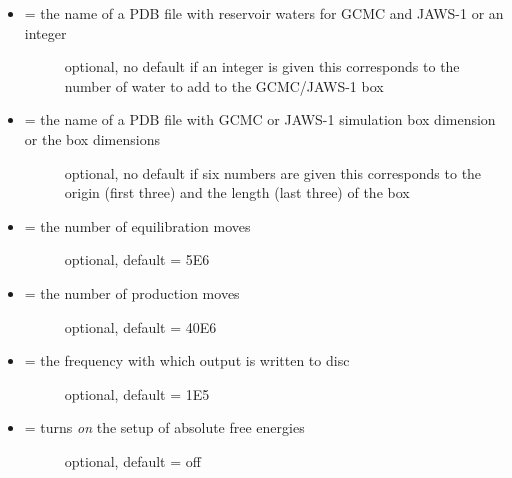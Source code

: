 \documentclass[letterpaper,10pt,english]{sphinxmanual}
\begin{document}
\begin{itemize}
\begin{description}
\end{description}

\item {} \begin{description}
\item[{ = the name of a PDB file with reservoir waters for GCMC and JAWS-1 or an integer}] \leavevmode
optional, no default
if an integer is given this corresponds to the number of water to add to the GCMC/JAWS-1 box

\end{description}

\item {} \begin{description}
\item[{ = the name of a PDB file with GCMC or JAWS-1 simulation box dimension or the box dimensions}] \leavevmode
optional, no default
if six numbers are given this corresponds to the origin (first three) and the length (last three) of the box

\end{description}

\item {} \begin{description}
\item[{ = the number of equilibration moves}] \leavevmode
optional, default = 5E6

\end{description}

\item {} \begin{description}
\item[{ = the number of production moves}] \leavevmode
optional, default = 40E6

\end{description}

\item {} \begin{description}
\item[{ = the frequency with which output is written to disc}] \leavevmode
optional, default = 1E5

\end{description}

\item {} \begin{description}
\item[{ = turns \emph{on} the setup of absolute free energies}] \leavevmode
optional, default = off


\end{description}
\end{itemize}
\end{document}
